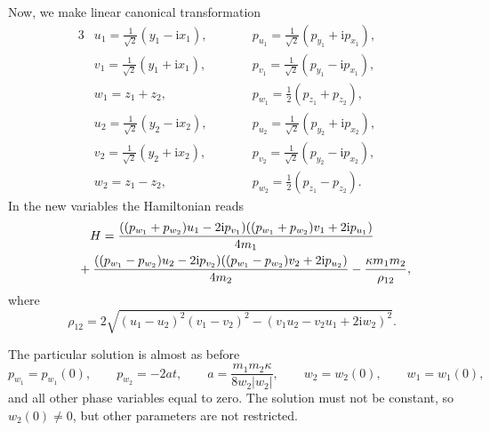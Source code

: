 \documentclass[pdftex]{sigma}
\numberwithin{equation}{section}
\begin{document}
Now, we make linear canonical transformation
\begin{alignat*}{3}
 &u_1 = \frac{1}{\sqrt{2}}(y_1-\mathrm{i} x_1),\qquad&&
 p_{u_1} = \frac{1}{\sqrt{2}}(p_{y_1}+\mathrm{i}p_{x_1}),&
 \\
& v_1 = \frac{1}{\sqrt{2}}(y_1+\mathrm{i} x_1),\qquad&&
 p_{v_1} =\frac{1}{\sqrt{2}}(p_{y_1}-\mathrm{i}p_{x_1}),&
 \\
& w_1 = z_1 +z_2, \qquad &&
 p_{w_1} = \frac12(p_{z_1}+p_{z_2}),&
 \\
 &u_2 = \frac{1}{\sqrt{2}}(y_2-\mathrm{i} x_2),\qquad&&
 p_{u_2} = \frac{1}{\sqrt{2}}(p_{y_2}+\mathrm{i}p_{x_2}),&
 \\
 &v_2 = \frac{1}{\sqrt{2}}(y_2+\mathrm{i} x_2),\qquad&&
 p_{v_2} =\frac{1}{\sqrt{2}}(p_{y_2}-\mathrm{i}p_{x_2}),&
 \\
& w_2 = z_1 -z_2, \qquad&&
 p_{w_2} = \frac12(p_{z_1}-p_{z_2}).&
\end{alignat*}
In the new variables the Hamiltonian reads
\begin{gather*}
 H = \frac{((p_{w_1}+p_{w_2})u_1-2\mathrm{i}p_{v_1})
 ((p_{w_1}+p_{w_2})v_1+2\mathrm{i}p_{u_1})}{4m_1}
 \\ \hphantom{ H =}
{} + \frac{((p_{w_1}-p_{w_2})u_2-2\mathrm{i}p_{v_2})
 ((p_{w_1}-p_{w_2})v_2+2\mathrm{i}p_{u_2})}{4m_2} -\frac{\kappa m_1 m_2}{\rho_{12}},
\end{gather*}
where
\begin{equation*}
 \rho_{12} = 2\sqrt{(u_1-u_2)^2(v_1-v_2)^2-(v_1 u_2 - v_2 u_1 + 2\mathrm{i}w_2)^2}.
\end{equation*}

The particular solution is almost as before
\begin{equation*}
 p_{w_1}=p_{w_1}(0),\qquad
 p_{w_2} = -2at,\qquad
 a = \frac{m_1 m_2\kappa}{8w_2|w_2|},\qquad
 w_2=w_2(0), \qquad
 w_1=w_1(0),
\end{equation*}
and all other phase variables equal to zero. The solution must not be constant, so $w_2(0)\neq 0$, but other parameters are not restricted.
\end{document}

